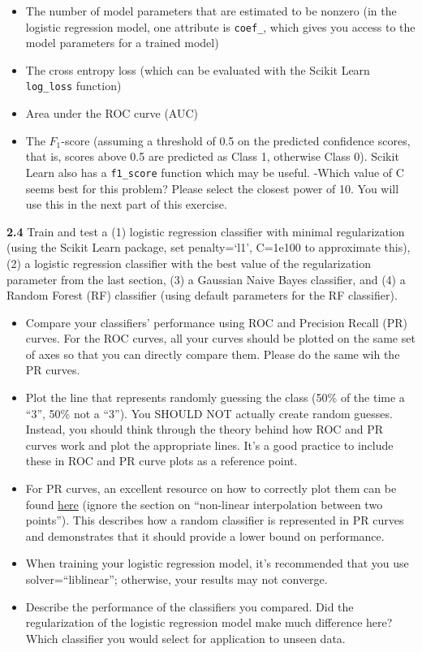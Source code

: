 \documentclass[
  letterpaper,
  DIV=11,
  numbers=noendperiod]{scrartcl}
\providecommand{\tightlist}{%
  \setlength{\itemsep}{0pt}\setlength{\parskip}{0pt}}\usepackage{longtable,booktabs,array}
\begin{document}
\begin{itemize}
\tightlist
\item
  The number of model parameters that are estimated to be nonzero (in
  the logistic regression model, one attribute is \texttt{coef\_}, which
  gives you access to the model parameters for a trained model)
\item
  The cross entropy loss (which can be evaluated with the Scikit Learn
  \texttt{log\_loss} function)
\item
  Area under the ROC curve (AUC)
\item
  The \(F_1\)-score (assuming a threshold of 0.5 on the predicted
  confidence scores, that is, scores above 0.5 are predicted as Class 1,
  otherwise Class 0). Scikit Learn also has a \texttt{f1\_score}
  function which may be useful. -Which value of C seems best for this
  problem? Please select the closest power of 10. You will use this in
  the next part of this exercise.
\end{itemize}

\textbf{2.4} Train and test a (1) logistic regression classifier with
minimal regularization (using the Scikit Learn package, set
penalty=`l1', C=1e100 to approximate this), (2) a logistic regression
classifier with the best value of the regularization parameter from the
last section, (3) a Gaussian Naive Bayes classifier, and (4) a Random
Forest (RF) classifier (using default parameters for the RF classifier).

\begin{itemize}
\tightlist
\item
  Compare your classifiers' performance using ROC and Precision Recall
  (PR) curves. For the ROC curves, all your curves should be plotted on
  the same set of axes so that you can directly compare them. Please do
  the same wih the PR curves.
\item
  Plot the line that represents randomly guessing the class (50\% of the
  time a ``3'', 50\% not a ``3''). You SHOULD NOT actually create random
  guesses. Instead, you should think through the theory behind how ROC
  and PR curves work and plot the appropriate lines. It's a good
  practice to include these in ROC and PR curve plots as a reference
  point.
\item
  For PR curves, an excellent resource on how to correctly plot them can
  be found
  \href{https://classeval.wordpress.com/introduction/introduction-to-the-precision-recall-plot/}{here}
  (ignore the section on ``non-linear interpolation between two
  points''). This describes how a random classifier is represented in PR
  curves and demonstrates that it should provide a lower bound on
  performance.
\item
  When training your logistic regression model, it's recommended that
  you use solver=``liblinear''; otherwise, your results may not
  converge.
\item
  Describe the performance of the classifiers you compared. Did the
  regularization of the logistic regression model make much difference
  here? Which classifier you would select for application to unseen
  data.
\end{itemize}
\end{document}
